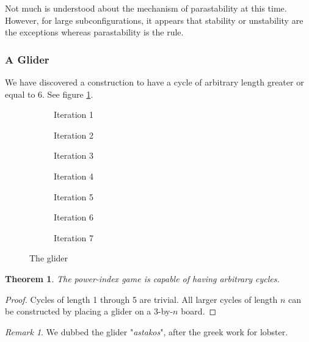 \documentclass[12pt]{article}
\newtheorem{theorem}{Theorem}%
\theoremstyle{definition}
\theoremstyle{remark}
\newtheorem{remark}{Remark}%
\theoremstyle{remark}
\begin{document}
\par
Not much is understood about the mechanism of parastability at this time. However, for large subconfigurations, it appears that stability or unstability are the exceptions whereas parastability is the rule.

\subsubsection{A Glider}
\par
We have discovered a construction to have a cycle of arbitrary length greater or equal to 6. See figure \ref{Astakos}.


\begin{figure}[H]
  \centering
  \begin{subfigure}[b]{0.25\linewidth}
    \caption{Iteration 1}
  \end{subfigure}
  \begin{subfigure}[b]{0.25\linewidth}
    \caption{Iteration 2}
  \end{subfigure}
  \begin{subfigure}[b]{0.25\linewidth}
    \caption{Iteration 3}
  \end{subfigure}
  \begin{subfigure}[b]{0.25\linewidth}
    \caption{Iteration 4}
  \end{subfigure}
  \begin{subfigure}[b]{0.25\linewidth}
    \caption{Iteration 5}
  \end{subfigure}
  \begin{subfigure}[b]{0.25\linewidth}
    \caption{Iteration 6}
  \end{subfigure}
  \begin{subfigure}[b]{0.25\linewidth}
    \caption{Iteration 7}
  \end{subfigure}
  \caption{The glider}
  \label{Astakos}
\end{figure}

\begin{theorem}
The power-index game is capable of having arbitrary cycles.
\end{theorem}
\begin{proof}
Cycles of length 1 through 5 are trivial. All larger cycles of length $n$ can be constructed by placing a glider on a $3$-by-$n$ board.
\end{proof}
\begin{remark}
We dubbed the glider "\textit{astakos}", after the greek work for lobster.
\end{remark}
\end{document}
